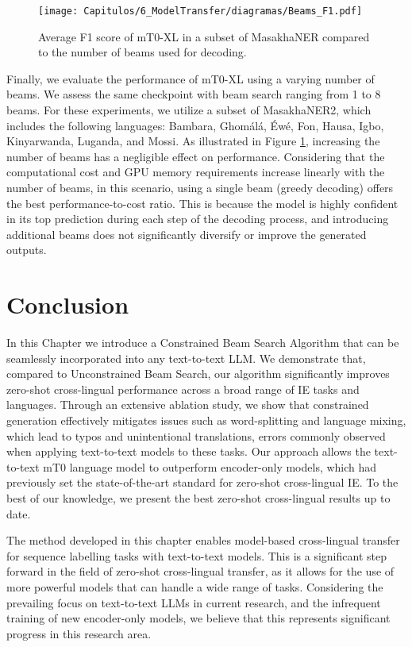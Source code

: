 \begin{figure}[t]
    \centering
    \texttt{[image: Capitulos/6\_ModelTransfer/diagramas/Beams\_F1.pdf]}
    \caption{Average F1 score of mT0-XL in a subset of MasakhaNER compared to the number of beams used for decoding.}
    \label{fig6:BeamsF1}
\end{figure}

Finally, we evaluate the performance of mT0-XL using a varying number of beams. We assess the same checkpoint with beam search ranging from 1 to 8 beams. For these experiments, we utilize a subset of MasakhaNER2, which includes the following languages: Bambara, Ghomálá, Éwé, Fon, Hausa, Igbo, Kinyarwanda, Luganda, and Mossi. As illustrated in Figure \ref{fig6:BeamsF1}, increasing the number of beams has a negligible effect on performance. Considering that the computational cost and GPU memory requirements increase linearly with the number of beams, in this scenario, using a single beam (greedy decoding) offers the best performance-to-cost ratio. This is because the model is highly confident in its top prediction during each step of the decoding process, and introducing additional beams does not significantly diversify or improve the generated outputs.

\section{Conclusion}

In this Chapter we introduce a Constrained Beam Search Algorithm that can be seamlessly incorporated into any text-to-text LLM. We demonstrate that, compared to Unconstrained Beam Search, our algorithm significantly improves zero-shot cross-lingual performance across a broad range of IE tasks and languages. Through an extensive ablation study, we show that constrained generation effectively mitigates issues such as word-splitting and language mixing, which lead to typos and unintentional translations, errors commonly observed when applying text-to-text models to these tasks. Our approach allows the text-to-text mT0 language model to outperform encoder-only models, which had previously set the state-of-the-art standard for zero-shot cross-lingual IE. To the best of our knowledge, we present the best zero-shot cross-lingual results up to date. 

The method developed in this chapter enables model-based cross-lingual transfer for sequence labelling tasks with text-to-text models. This is a significant step forward in the field of zero-shot cross-lingual transfer, as it allows for the use of more powerful models that can handle a wide range of tasks. Considering the prevailing focus on text-to-text LLMs in current research, and the infrequent training of new encoder-only models, we believe that this represents significant progress in this research area. 